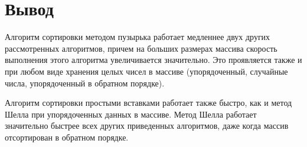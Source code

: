 \section{Вывод}
Алгоритм сортировки методом пузырька работает медленнее двух других рассмотренных алгоритмов, причем на больших размерах массива скорость выполнения этого алгоритма увеличивается значительно. Это проявляется также и при любом виде хранения целых чисел в массиве (упорядоченный, случайные числа, упорядоченный в обратном порядке).

Алгоритм сортировки простыми вставками работает также быстро, как и метод Шелла при упорядоченных данных в массиве. Метод Шелла работает значительно быстрее всех других приведенных алгоритмов, даже когда массив отсортирован в обратном порядке.